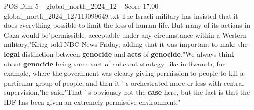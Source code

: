 \begin{textsample}{POS Dim 5 – global\_north\_2024\_12 – Score 17.00 – global\_north\_2024\_12/119099649.txt}
The Israeli military has insisted that it does everything possible to limit the loss of human life.
But many of its actions in Gaza would be"permissible, acceptable under any circumstance within a Western military,"Krieg told NBC News Friday, adding that it was important to make the \textbf{legal} distinction between \textbf{genocide} and \textbf{acts} of \textbf{genocide}."We always think about \textbf{genocide} being some sort of coherent strategy, like in Rwanda, for example, where the government was clearly giving permission to people to kill a particular group of people, and then it ' s orchestrated more or less with central supervision,"he said."That ' s obviously not the \textbf{case} here, but the fact is that the IDF has been given an extremely permissive environment."

\end{textsample}
